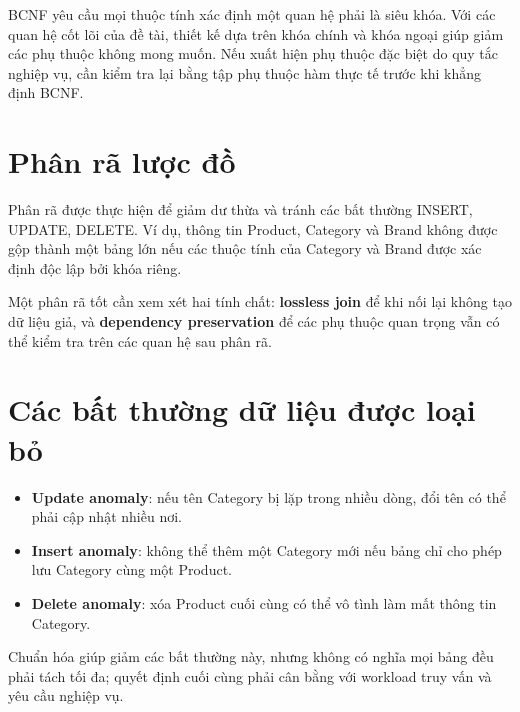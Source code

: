 BCNF yêu cầu mọi thuộc tính xác định một quan hệ phải là siêu khóa. Với các quan hệ cốt lõi của đề tài, thiết kế dựa trên khóa chính và khóa ngoại giúp giảm các phụ thuộc không mong muốn. Nếu xuất hiện phụ thuộc đặc biệt do quy tắc nghiệp vụ, cần kiểm tra lại bằng tập phụ thuộc hàm thực tế trước khi khẳng định BCNF.

\section{Phân rã lược đồ}

Phân rã được thực hiện để giảm dư thừa và tránh các bất thường INSERT, UPDATE, DELETE. Ví dụ, thông tin Product, Category và Brand không được gộp thành một bảng lớn nếu các thuộc tính của Category và Brand được xác định độc lập bởi khóa riêng.

Một phân rã tốt cần xem xét hai tính chất: \textbf{lossless join} để khi nối lại không tạo dữ liệu giả, và \textbf{dependency preservation} để các phụ thuộc quan trọng vẫn có thể kiểm tra trên các quan hệ sau phân rã.

\section{Các bất thường dữ liệu được loại bỏ}

\begin{itemize}
    \item \textbf{Update anomaly}: nếu tên Category bị lặp trong nhiều dòng, đổi tên có thể phải cập nhật nhiều nơi.
    \item \textbf{Insert anomaly}: không thể thêm một Category mới nếu bảng chỉ cho phép lưu Category cùng một Product.
    \item \textbf{Delete anomaly}: xóa Product cuối cùng có thể vô tình làm mất thông tin Category.
\end{itemize}

Chuẩn hóa giúp giảm các bất thường này, nhưng không có nghĩa mọi bảng đều phải tách tối đa; quyết định cuối cùng phải cân bằng với workload truy vấn và yêu cầu nghiệp vụ.

